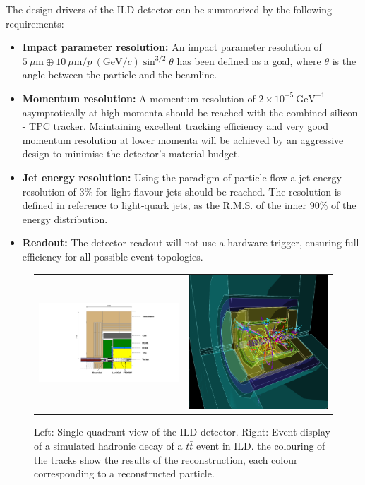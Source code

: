 \documentclass[%
 amsmath,amssymb,
 aps,
 longbibliography,
]{revtex4-1}
\begin{document}
The design drivers of the ILD detector can be summarized by the following requirements: 
\begin{itemize}
    \item {\bf Impact parameter resolution:}  An impact parameter resolution of $ 5~\mu \mathrm{m} \oplus 10~\mu \mathrm{m} / p~({\mathrm{GeV}/c})\sin^{3/2}\theta$ has been defined as a goal, where $\theta$ is the angle between the particle and the beamline. 
    \item {\bf Momentum resolution:} A momentum resolution of $2 \times 10^{-5}~\mathrm{GeV}^{-1}$ asymptotically at high momenta should be reached with the combined silicon - TPC tracker. Maintaining excellent tracking efficiency and very good momentum resolution at lower momenta will be achieved by an aggressive design to minimise the detector's material budget.
    \item {\bf Jet energy resolution:} Using the paradigm of particle flow a jet energy resolution of $3\%$ for light flavour jets should be reached. The resolution is defined in reference to light-quark jets, as the R.M.S. of the inner $90\%$ of the energy distribution. 
    \item {\bf Readout:} The detector readout will not use a hardware trigger, ensuring full efficiency for all possible event topologies.
\end{itemize}

\begin{figure}[tb]
 \begin{center}
 \begin{tabular}{lr}
 \includegraphics[width=0.48\hsize,clip]{figures/ILD_quadrant_new.pdf} & 
 \includegraphics[width=0.35\hsize]{figures/ttbar_500GeV_3dview-41.png}
 \\
 \end{tabular}
\caption{Left: Single quadrant view of the ILD detector. Right: Event display of a simulated hadronic decay of a $t \bar t$ event in ILD. the colouring of the tracks show the results of the reconstruction, each colour corresponding to a reconstructed particle.
\label{fig:ILD}}
 \end{center}
 \end{figure}
\end{document}
